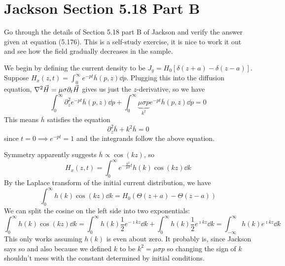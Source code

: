 \documentclass[a4paper,twoside]{article}
\begin{document}
\section{Jackson Section 5.18 Part B}
Go through the details of Section 5.18 part B of Jackson and verify the answer given at equation (5.176). This is a self-study exercise, it is nice to work it out and see how the field gradually decreases in the sample.
\begin{problem}
    We begin by defining the current density to be $ J_y = H_0[\delta(z+a) - \delta(z-a)] $. Suppose $ H_x(z,t) = \int_{0}^{\infty} e^{-pt} \overline{h}(p,z) \dd{p} $. Plugging this into the diffusion equation, $ \laplacian{ \vec{H}} = \mu \sigma \partial_t \vec{H} $ gives us just the $ z $-derivative, so we have
    \begin{equation}
        \int_{0}^{\infty} \partial^2_z e^{-pt} \overline{h}(p,z) \dd{p} + \int_{0}^{\infty} \underbrace{\mu \sigma p}_{k^2} e^{-pt} \overline{h}(p,z) \dd{p} = 0
    \end{equation}
    This means $ \overline{h} $ satisfies the equation
    \begin{equation}
        \partial_z^2 \overline{h} + k^2 \overline{h} = 0
    \end{equation}
    since $ t=0 \implies e^{-pt} = 1 $ and the integrands follow the above equation.

    Symmetry apparently suggests $ \overline{h} \propto \cos(kz) $, so
    \begin{equation}
        H_x(z, t) = \int_{0}^{\infty} e^{- \frac{k^2}{\mu \sigma} t} h(k) \cos(kz) \dd{k} 
    \end{equation}
    By the Laplace transform of the initial current distribution, we have
    \begin{equation}
        \int_{0}^{\infty} h(k) \cos(kz) \dd{k} = H_0(\Theta(z+a) - \Theta(z-a))
    \end{equation}
    We can split the cosine on the left side into two exponentials:
    \begin{equation}
        \int_{0}^{\infty} h(k) \cos(kz) \dd{k} = \int_{0}^{\infty} h(k) \frac{1}{2} e^{-\imath kz} \dd{k} + \int_{0}^{\infty} h(k) \frac{1}{2} e^{\imath kz} \dd{k} = \int_{- \infty}^{\infty} h(k) e^{\imath kz} \dd{k}
    \end{equation}
    This only works assuming $ h(k) $ is even about zero. It probably is, since Jackson says so and also because we defined $ k $ to be $ k^2 = \mu \sigma p $ so changing the sign of $ k $ shouldn't mess with the constant determined by initial conditions.


\end{problem}
\end{document}
